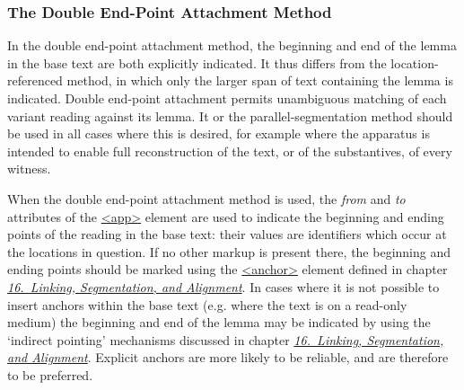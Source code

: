 \subsubsection[{The Double End-Point Attachment Method}]{The Double End-Point Attachment Method}\label{TCAPDE}\par
In the double end-point attachment method, the beginning and end of the lemma in the base text are both explicitly indicated. It thus differs from the location-referenced method, in which only the larger span of text containing the lemma is indicated. Double end-point attachment permits unambiguous matching of each variant reading against its lemma. It or the parallel-segmentation method should be used in all cases where this is desired, for example where the apparatus is intended to enable full reconstruction of the text, or of the substantives, of every witness.\par
When the double end-point attachment method is used, the {\itshape from} and {\itshape to} attributes of the \hyperref[TEI.app]{<app>} element are used to indicate the beginning and ending points of the reading in the base text: their values are identifiers which occur at the locations in question. If no other markup is present there, the beginning and ending points should be marked using the \hyperref[TEI.anchor]{<anchor>} element defined in chapter \textit{\hyperref[SA]{16.\ Linking, Segmentation, and Alignment}}. In cases where it is not possible to insert anchors within the base text (e.g. where the text is on a read-only medium) the beginning and end of the lemma may be indicated by using the ‘indirect pointing’ mechanisms discussed in chapter \textit{\hyperref[SA]{16.\ Linking, Segmentation, and Alignment}}. Explicit anchors are more likely to be reliable, and are therefore to be preferred.\par

